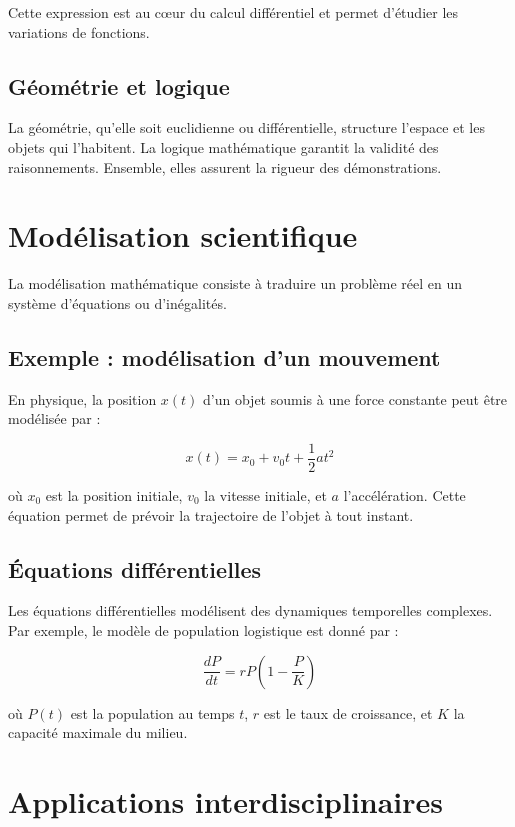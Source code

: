 \documentclass[11pt,a4paper]{article}
\begin{document}
Cette expression est au cœur du calcul différentiel et permet d'étudier les variations de fonctions.

\subsection*{Géométrie et logique}

La géométrie, qu’elle soit euclidienne ou différentielle, structure l’espace et les objets qui l’habitent. La logique mathématique garantit la validité des raisonnements. Ensemble, elles assurent la rigueur des démonstrations.

\section{Modélisation scientifique}

La modélisation mathématique consiste à traduire un problème réel en un système d’équations ou d’inégalités.

\subsection*{Exemple : modélisation d’un mouvement}

En physique, la position $x(t)$ d’un objet soumis à une force constante peut être modélisée par :

\begin{equation}
x(t) = x_0 + v_0 t + \frac{1}{2} a t^2
\end{equation}

où $x_0$ est la position initiale, $v_0$ la vitesse initiale, et $a$ l’accélération. Cette équation permet de prévoir la trajectoire de l’objet à tout instant.

\subsection*{Équations différentielles}

Les équations différentielles modélisent des dynamiques temporelles complexes. Par exemple, le modèle de population logistique est donné par :

\begin{equation}
\frac{dP}{dt} = r P \left(1 - \frac{P}{K}\right)
\end{equation}

où $P(t)$ est la population au temps $t$, $r$ est le taux de croissance, et $K$ la capacité maximale du milieu.

\section{Applications interdisciplinaires}
\end{document}
